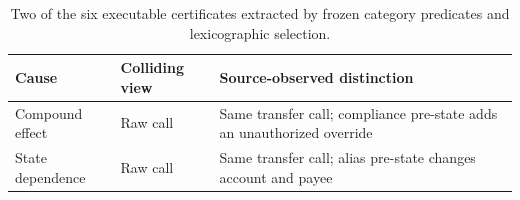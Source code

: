 \begin{table}[t]
\centering
\scriptsize
\setlength{\tabcolsep}{2pt}
\caption{Two of the six executable certificates extracted by frozen category predicates and lexicographic selection.}
\label{tab:failure-certificates}
\begin{tabular}{p{}p{}p{}}
\toprule
Cause & Colliding view & Source-observed distinction \\
\midrule
Compound effect & Raw call & Same transfer call; compliance pre-state adds an unauthorized override \\
State dependence & Raw call & Same transfer call; alias pre-state changes account and payee \\
\bottomrule
\end{tabular}
\end{table}
